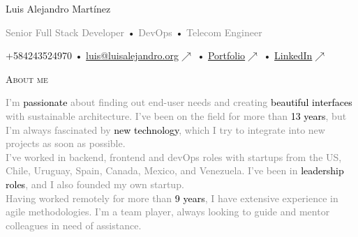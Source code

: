\documentclass[12pt]{article}
\begin{document}
\centering
\begin{cv}{Luis Alejandro Mart\'inez}
  
  \vspace{0.25em}
  \textcolor{gray}{Senior Full Stack Developer} •
  \textcolor{gray}{DevOps} •
  \textcolor{gray}{Telecom Engineer}

  \vspace{0.125em}
  +584243524970 •
  \href{mailto:luis@luisalejandro.org}{luis@luisalejandro.org\footnotesize{$\nearrow$}} •
  \href{https://luisalejandro.org/portfolio}{Portfolio\footnotesize{$\nearrow$}} •
  \href{https://www.linkedin.com/in/martinezfaneyth/}{LinkedIn\footnotesize{$\nearrow$}}
  \vspace{0.125em}

  \hrulefill

  \begin{minipage}[t]{0.35\textwidth}
    \vspace{0.125em}

    \begin{minipage}{\linewidth}
      \textrm{\textsc{\Large{About me}}}
      \newline
      \parbox[t]{\linewidth}{
        \footnotesize{\textcolor{gray}{I'm} \textcolor{black}{passionate} \textcolor{gray}{about finding out end-user needs and creating \textcolor{black}{beautiful interfaces} with sustainable architecture. I've been on the field for more than \textcolor{black}{13 years}, but I'm always fascinated by \textcolor{black}{new technology}, which I try to integrate into new projects as soon as possible.}}\\
        \footnotesize{\textcolor{gray}{I've worked in backend, frontend and devOps roles with startups from the US, Chile, Uruguay, Spain, Canada, Mexico, and Venezuela. I've been in \textcolor{black}{leadership roles}, and I also founded my own startup.}}\\
        \footnotesize{\textcolor{gray}{Having worked remotely for more than \textcolor{black}{9 years}, I have extensive experience in agile methodologies. I'm a team player, always looking to guide and mentor colleagues in need of assistance.}}\\
      }
      \newline
    \end{minipage}


\end{minipage}
\end{cv}
\end{document}
